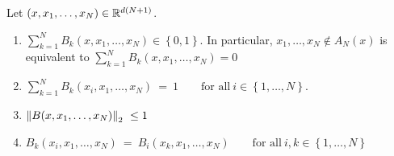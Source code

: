 \begin{lemma}
  \label{lem:basis_sum}
  Let $(x,x_1,\ldots,x_N)\in\mathbb{R}^{d(N+1)}$.
  \begin{enumerate}[label=(\roman*)]
    \item
      $
      \sum_{k=1}^{N} 
      B_k(x,x_1,\ldots,x_N)
      \in
      \left\{ 0,1 \right\}
      $. 
      In particular,
      $
        x_1,\ldots,x_N\notin A_N(x)
      $
      is equivalent to
      $
      \sum_{k=1}^{N} 
      B_k(x,x_1,\ldots,x_N)
      =0
      $
    \item
      $
      \sum_{k=1}^{N} 
      B_k(x_i,x_1,\ldots,x_N)
      \ 
      =
      \ 
      1
      \qquad
      \text{for all}\ 
      i\in \left\{ 1,\ldots,N \right\}
      $.
      \item
        $
        \norm
        {
      B(x,x_1,\ldots,x_N)
        }_2
        \ 
        \le 1
        \ 
        $
      \item
        $
        B_k(x_i,x_1,\ldots,x_N)
        \ 
        =
        \ 
        B_i(x_k,x_1,\ldots,x_N)
        \qquad
        \text{for all}\ 
        i,k\in \left\{ 1,\ldots,N \right\}
        $
  \end{enumerate}
\end{lemma}

